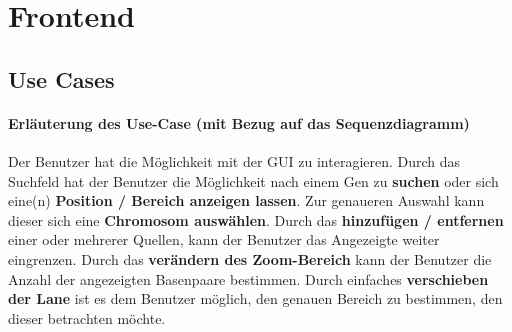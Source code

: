 \section{Frontend}
\subsection{Use Cases}
\paragraph{Erläuterung des Use-Case (mit Bezug auf das Sequenzdiagramm)}
Der Benutzer hat die Möglichkeit mit der GUI zu interagieren. Durch das Suchfeld hat der Benutzer die Möglichkeit nach einem Gen zu \textbf{suchen} oder sich eine(n) \textbf{Position / Bereich anzeigen lassen}. Zur genaueren Auswahl kann dieser sich eine \textbf{Chromosom auswählen}. Durch das \textbf{hinzufügen / entfernen} einer oder mehrerer Quellen, kann der Benutzer das Angezeigte weiter eingrenzen. Durch das \textbf{verändern des Zoom-Bereich} kann der Benutzer die Anzahl der angezeigten Basenpaare bestimmen. Durch einfaches \textbf{verschieben der Lane} ist es dem Benutzer möglich, den genauen Bereich zu bestimmen, den dieser betrachten möchte.

